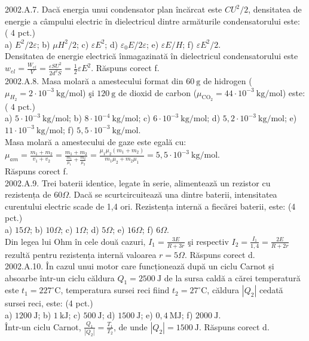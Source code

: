 2002.A.7. Dacă energia unui condensator plan încărcat este $C U^{2} / 2$, densitatea de energie a câmpului electric în dielectricul dintre armăturile condensatorului este: ( 4 pct.)\\ a) $E^{2} / 2 \varepsilon$; b) $\mu H^{2} / 2$; c) $\varepsilon E^{2}$; d) $\varepsilon_{0} E / 2 \varepsilon$; e) $\varepsilon E / H$; f) $\varepsilon E^{2} / 2$.\\ Densitatea de energie electrică înmagazinată în dielectricul condensatorului este $w_{el}=\frac{W_{el}}{V}=\frac{\varepsilon S U^{2}}{2 d^{2} S}=\frac{1}{2} \varepsilon E^{2}$. Răspuns corect f.\\

2002.A.8. Masa molară a amestecului format din $60 \mathrm{~g}$ de hidrogen ($\mu_{H_{2}}=2 \cdot 10^{-3} \mathrm{~kg} / \mathrm{mol}$) şi $120 \mathrm{~g}$ de dioxid de carbon ($\mu_{\mathrm{CO}_{2}}=44 \cdot 10^{-3} \mathrm{~kg} / \mathrm{mol}$) este: ( 4 pct.)\\ a) $5 \cdot 10^{-3} \mathrm{~kg} / \mathrm{mol}$; b) $8 \cdot 10^{-4} \mathrm{~kg} / \mathrm{mol}$; c) $6 \cdot 10^{-3} \mathrm{~kg} / \mathrm{mol}$; d) $5,2 \cdot 10^{-3} \mathrm{~kg} / \mathrm{mol}$; e) $11 \cdot 10^{-3} \mathrm{~kg} / \mathrm{mol}$; f) $5,5 \cdot 10^{-3} \mathrm{~kg} / \mathrm{mol}$.\\ Masa molară a amestecului de gaze este egală cu:\\ $\mu_{am}=\frac{m_{1}+m_{2}}{v_{1}+v_{2}}=\frac{m_{1}+m_{2}}{\frac{m_{1}}{\mu_{1}}+\frac{m_{2}}{\mu_{2}}}=\frac{\mu_{1} \mu_{2}\left(m_{1}+m_{2}\right)}{m_{1} \mu_{2}+m_{2} \mu_{1}}=5,5 \cdot 10^{-3} \mathrm{~kg} / \mathrm{mol}$.\\ Răspuns corect f.\\

2002.A.9. Trei baterii identice, legate în serie, alimentează un rezistor cu rezistența de $60 \Omega$. Dacă se scurtcircuitează una dintre baterii, intensitatea curentului electric scade de 1,4 ori. Rezistența internă a fiecărei baterii, este: (4 pct.)\\ a) $15 \Omega$; b) $10 \Omega$; c) $1 \Omega$; d) $5 \Omega$; e) $16 \Omega$; f) $6 \Omega$.\\ Din legea lui Ohm în cele două cazuri, $I_{1}=\frac{3 E}{R+3 r}$ şi respectiv $I_{2}=\frac{I_{1}}{1,4}=\frac{2 E}{R+2 r}$ rezultă pentru rezistența internă valoarea $r=5 \Omega$. Răspuns corect d.\\

2002.A.10. În cazul unui motor care funcționează după un ciclu Carnot și absoarbe într-un ciclu căldura $Q_{1}=2500 \mathrm{~J}$ de la sursa caldă a cărei temperatură este $t_{1}=227^{\circ} \mathrm{C}$, temperatura sursei reci fiind $t_{2}=27^{\circ} \mathrm{C}$, căldura $\left|Q_{2}\right|$ cedată sursei reci, este: (4 pct.)\\ a) $1200 \mathrm{~J}$; b) $1 \mathrm{~kJ}$; c) $500 \mathrm{~J}$; d) $1500 \mathrm{~J}$; e) $0,4 \mathrm{~MJ}$; f) $2000 \mathrm{~J}$.\\ Într-un ciclu Carnot, $\frac{Q_{1}}{\left|Q_{2}\right|}=\frac{T_{1}}{T_{2}}$, de unde $\left|Q_{2}\right|=1500 \mathrm{~J}$. Răspuns corect d.\\

